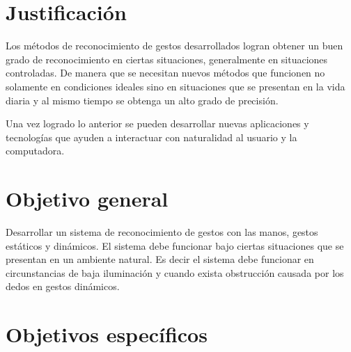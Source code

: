 
\section{Justificaci\'on}\label{sec:Just}

Los métodos de reconocimiento de gestos desarrollados logran obtener un buen grado de reconocimiento en ciertas situaciones, generalmente en situaciones controladas.
De manera que se necesitan nuevos métodos que funcionen no solamente en condiciones ideales sino en situaciones que se presentan en la vida diaria y al mismo tiempo se obtenga un alto grado de precisión.  

Una vez logrado lo anterior se pueden desarrollar nuevas aplicaciones y tecnologías que ayuden a interactuar con naturalidad al usuario y la computadora.




\section{Objetivo general}\label{sec:ObjetivoGeneral}
 
Desarrollar un sistema de reconocimiento de gestos con las manos, gestos estáticos y dinámicos. El sistema debe funcionar bajo ciertas situaciones que se presentan en un ambiente natural. Es decir el sistema debe funcionar en circunstancias de baja iluminación y cuando exista obstrucción causada por los dedos en gestos dinámicos.




\section{Objetivos espec\'ificos}\label{sec:objetivosEspecificos}


